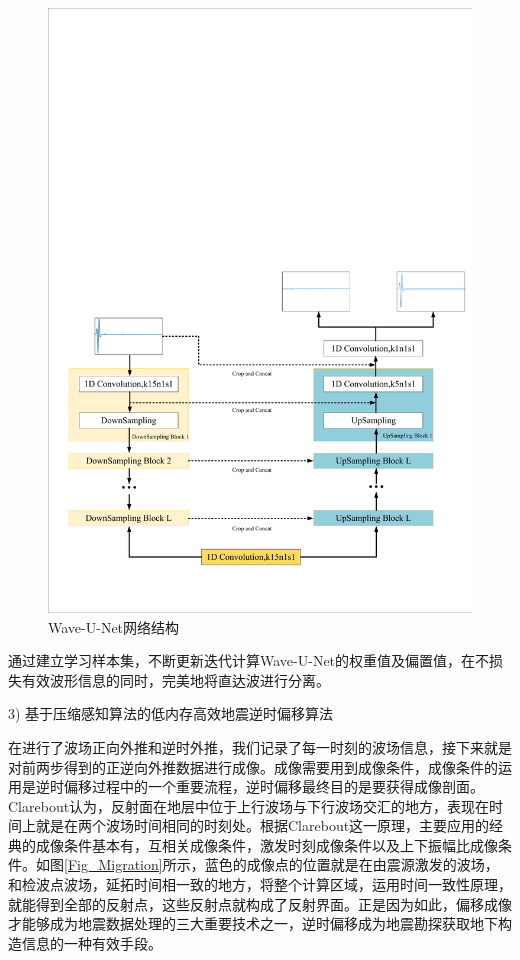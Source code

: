 \documentclass[11pt]{article}
\begin{document}
\begin{figure}[htbp]
\centering
\includegraphics[width=5.5in]{./FigureFolder/U-Net/UNet.pdf}
\caption{Wave-U-Net网络结构}
\label{Fig_U-Net}
\end{figure}
\par
通过建立学习样本集，不断更新迭代计算Wave-U-Net的权重值及偏置值，在不损失有效波形信息的同时，完美地将直达波进行分离。
\par
3) 基于压缩感知算法的低内存高效地震逆时偏移算法
\par
在进行了波场正向外推和逆时外推，我们记录了每一时刻的波场信息，接下来就是对前两步得到的正逆向外推数据进行成像。成像需要用到成像条件，成像条件的运用是逆时偏移过程中的一个重要流程，逆时偏移最终目的是要获得成像剖面。Clarebout认为，反射面在地层中位于上行波场与下行波场交汇的地方，表现在时间上就是在两个波场时间相同的时刻处。根据Clarebout这一原理，主要应用的经典的成像条件基本有，互相关成像条件，激发时刻成像条件以及上下振幅比成像条件。如图\ref{Fig_Migration}所示，蓝色的成像点的位置就是在由震源激发的波场，和检波点波场，延拓时间相一致的地方，将整个计算区域，运用时间一致性原理，就能得到全部的反射点，这些反射点就构成了反射界面。正是因为如此，偏移成像才能够成为地震数据处理的三大重要技术之一，逆时偏移成为地震勘探获取地下构造信息的一种有效手段。
\end{document}
